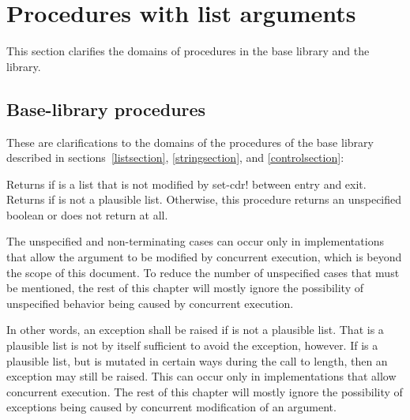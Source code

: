 \section{Procedures with list arguments}
\label{proceduresmutablelistargumentssection}

This section clarifies the domains of procedures in the base
library and the  library.

\subsection{Base-library procedures}

These are clarifications to the domains of the procedures of the base
library described in sections~\ref{listsection}, \ref{stringsection},
and \ref{controlsection}:

\begin{entry}{%
}

Returns \schtrue{} if  is a list that is not modified
by {\cf set-cdr!} between entry and exit.
Returns \schfalse{} if  is not a plausible list.
Otherwise, this procedure returns an unspecified boolean
or does not return at all.

\begin{note}
The unspecified and non-terminating cases can occur only
in implementations that allow the argument to be modified
by concurrent execution, which is beyond the scope of this
document.
To reduce the number of unspecified cases that must be
mentioned, the rest of this chapter will mostly ignore
the possibility of unspecified behavior being caused by
concurrent execution.
\end{note}
\end{entry}

\begin{entry}{%
}


\begin{note}
In other words, an exception shall be raised if 
is not a plausible list.
That  is a plausible list is not by
itself sufficient to avoid the exception, however.
If  is a plausible list, but is
mutated in certain ways during the call to {\cf length},
then an exception may still be raised.
This can occur only in implementations that allow
concurrent execution.  The rest of this chapter
will mostly ignore the possibility of exceptions being
caused by concurrent modification of an argument.
\end{note}
\end{entry}

